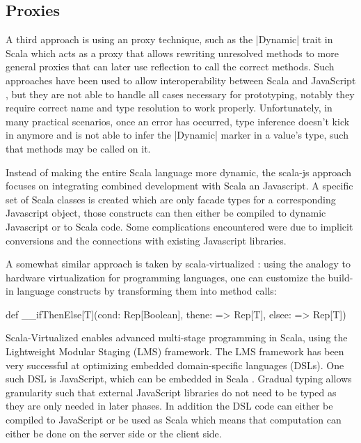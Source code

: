 \subsection{Proxies}

A third approach is using an proxy technique, such as the |Dynamic| trait in Scala \cite{dynamic} which acts as a proxy that allows rewriting unresolved methods to more general proxies that can later use reflection to call the correct methods. Such approaches have been used to allow interoperability between Scala and JavaScript \cite{scala-js}, but they are not able to handle all cases necessary for prototyping, notably they require correct name and type resolution to work properly. Unfortunately, in many practical scenarios, once an error has occurred, type inference doesn't kick in anymore and is not able to infer the |Dynamic| marker in a value's type, such that methods may be called on it.

Instead of making the entire Scala language more dynamic, the scala-js approach \cite{scala-js} focuses on integrating combined development with Scala an Javascript. A specific set of Scala classes is created which are only facade types for a corresponding Javascript object, those constructs can then either be compiled to dynamic Javascript or to Scala code. Some complications encountered were due to implicit conversions and the connections with existing Javascript libraries.

A somewhat similar approach is taken by scala-virtualized \cite{scala-virtualized}: using the analogy to hardware virtualization for programming languages, one can customize the build-in language constructs by transforming them into method calls:

\begin{lstlisting-nobreak}
def __ifThenElse[T](cond: Rep[Boolean], thene: => Rep[T], elsee: => Rep[T])
\end{lstlisting-nobreak}

Scala-Virtualized enables advanced multi-stage programming in Scala, using the Lightweight Modular Staging (LMS) framework. The LMS framework has been very successful at optimizing embedded domain-specific languages (DSLs). One such DSL is JavaScript, which can be embedded in Scala \cite{greg-js-dsl}. Gradual typing allows granularity such that external JavaScript libraries do not need to be typed as they are only needed in later phases. In addition the DSL code can either be compiled to JavaScript or be used as Scala which means  that computation can either be done on the server side or the client side.

